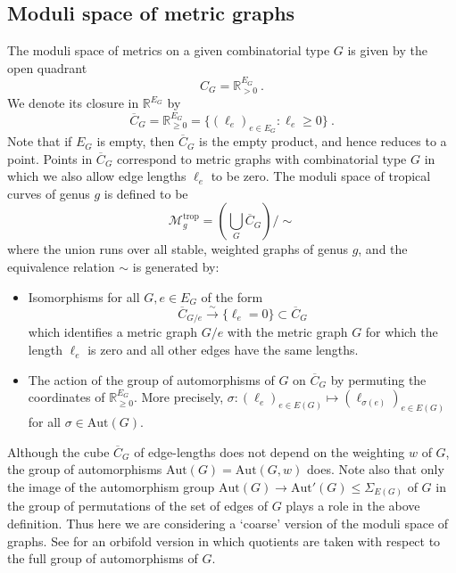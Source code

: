 \documentclass[12pt]{amsart}
\newcommand{\RR}{{\mathbb R}}
\theoremstyle{plain}
\newcommand{\trop}{\mathrm{trop}}
\newcommand{\To}{\longrightarrow}
\newcommand{\0}{\color{blue}{\mathsf{0}}}
\begin{document}
\subsection{Moduli space of metric graphs} The moduli space of metrics on a given combinatorial type $G$ is given by the open quadrant
\[ C_G =  \RR_{>0}^{E_G}  \ .  \]
 We denote its closure in $  \RR^{E_G}$ by 
 \[ \overline{C}_G = \RR_{\geq 0}^{E_G}  = \{ (\ell_e)_{e\in E_G}: \ell_e \geq 0 \}\ . \]
Note that if $E_G$ is empty, then $\overline{C}_G$ is the empty product,   and hence reduces to a point. 
 Points in $\overline{C}_G$ correspond to metric graphs with combinatorial type $G$ in which we also allow edge lengths $\ell_e$ to be zero. The moduli space of tropical curves of genus $g$ is defined to be 
 \[ \mathcal{M}_g^{\trop} =  \left( \bigcup_{G} \overline{C}_G \right) / \sim \] 
where the union runs over all stable, weighted graphs of genus $g$, and the equivalence relation $\sim$ is generated by: 
\begin{itemize}
\item Isomorphisms  for all $G, e\in E_G$ of the form
\[ \overline{C}_{G/e}  \overset{\sim}{\To} \{\ell_e=0\} \subset  \overline{C}_G\]
which identifies a metric graph $G/e$ with the  metric graph $G$ for which the length $\ell_e$ is zero and all other edges have the same lengths. 
\item  The action of the group of automorphisms of $G$ on $\overline{C}_G$ by permuting the coordinates of $\RR_{\geq 0}^{E_G}$. More precisely, 
$\sigma: (\ell_e)_{e\in E(G)} \mapsto (\ell_{\sigma(e)})_{e\in E(G)}$ for all $\sigma \in \mathrm{Aut}(G)$. 
\end{itemize}
Although the cube $\overline{C}_G$ of edge-lengths does not depend on the weighting $w$ of $G$, the group of automorphisms $\mathrm{Aut}(G) = \mathrm{Aut}(G,w)$ does.
Note also that only the image of the automorphism group  $\mathrm{Aut}(G) 
\rightarrow \mathrm{Aut}'(G) \leq \Sigma_{E(G)}$ of $G$ in the group of permutations of the set of edges of $G$ plays a role in the above definition. Thus  here we are considering a `coarse' version of the moduli space of graphs. See \cite{ModuliGraphsStack}  for an orbifold version in which quotients are taken with respect to the full group of automorphisms of $G$. 
\end{document}
